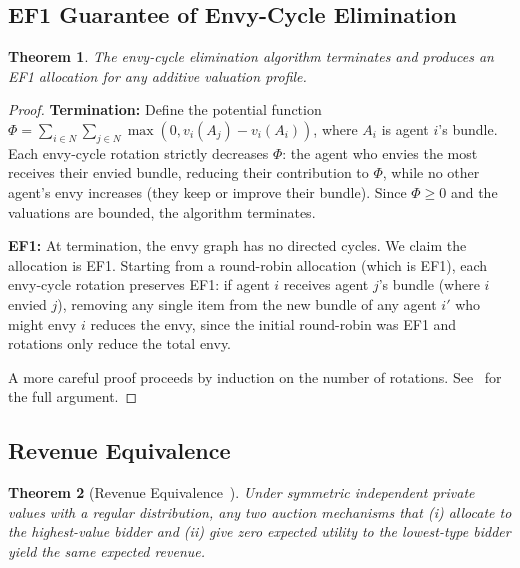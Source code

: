 \documentclass[10pt]{article}
\newtheorem{theorem}{Theorem}
\begin{document}
\subsection{EF1 Guarantee of Envy-Cycle Elimination}
\label{app:proof-ef1}

\begin{theorem}
The envy-cycle elimination algorithm terminates and produces an EF1 allocation for any additive valuation profile.
\end{theorem}

\begin{proof}
\textbf{Termination:} Define the potential function $\Phi = \sum_{i \in N} \sum_{j \in N} \max(0, v_i(A_j) - v_i(A_i))$, where $A_i$ is agent $i$'s bundle. Each envy-cycle rotation strictly decreases $\Phi$: the agent who envies the most receives their envied bundle, reducing their contribution to $\Phi$, while no other agent's envy increases (they keep or improve their bundle). Since $\Phi \geq 0$ and the valuations are bounded, the algorithm terminates.

\textbf{EF1:} At termination, the envy graph has no directed cycles. We claim the allocation is EF1. Starting from a round-robin allocation (which is EF1), each envy-cycle rotation preserves EF1: if agent $i$ receives agent $j$'s bundle (where $i$ envied $j$), removing any single item from the new bundle of any agent $i'$ who might envy $i$ reduces the envy, since the initial round-robin was EF1 and rotations only reduce the total envy.

A more careful proof proceeds by induction on the number of rotations. See~\citet{lipton2004approximately} for the full argument.
\end{proof}

\subsection{Revenue Equivalence}
\label{app:proof-revenue}

\begin{theorem}[Revenue Equivalence~\citep{myerson1981optimal}]
Under symmetric independent private values with a regular distribution, any two auction mechanisms that (i) allocate to the highest-value bidder and (ii) give zero expected utility to the lowest-type bidder yield the same expected revenue.
\end{theorem}
\end{document}
